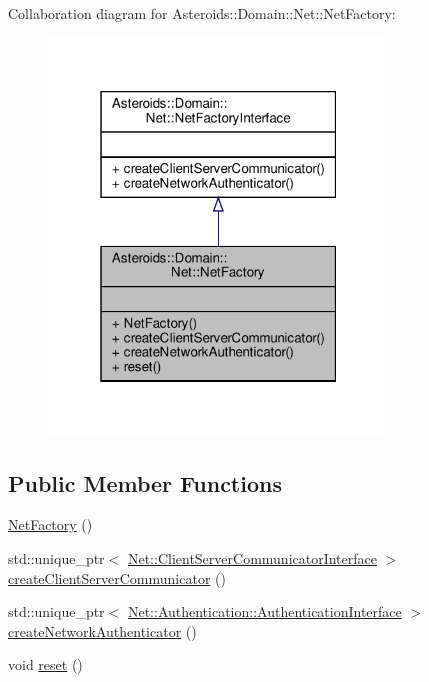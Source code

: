 Collaboration diagram for Asteroids\+:\+:Domain\+:\+:Net\+:\+:Net\+Factory\+:\nopagebreak
\begin{figure}[H]
\begin{center}
\leavevmode
\includegraphics[width=256pt]{classAsteroids_1_1Domain_1_1Net_1_1NetFactory__coll__graph}
\end{center}
\end{figure}
\subsection*{Public Member Functions}
\begin{DoxyCompactItemize}
\item 
\hyperlink{classAsteroids_1_1Domain_1_1Net_1_1NetFactory_ab5717fbd5dd1c35e1b7af78cb01269cc}{Net\+Factory} ()
\item 
std\+::unique\+\_\+ptr$<$ \hyperlink{classAsteroids_1_1Domain_1_1Net_1_1ClientServerCommunicatorInterface}{Net\+::\+Client\+Server\+Communicator\+Interface} $>$ \hyperlink{classAsteroids_1_1Domain_1_1Net_1_1NetFactory_ac7ae824eced4da33e4d79e4f219a67e1}{create\+Client\+Server\+Communicator} ()
\item 
std\+::unique\+\_\+ptr$<$ \hyperlink{classAsteroids_1_1Domain_1_1Net_1_1Authentication_1_1AuthenticationInterface}{Net\+::\+Authentication\+::\+Authentication\+Interface} $>$ \hyperlink{classAsteroids_1_1Domain_1_1Net_1_1NetFactory_a2fafb49fb45db12d21f45d2753315225}{create\+Network\+Authenticator} ()
\item 
void \hyperlink{classAsteroids_1_1Domain_1_1Net_1_1NetFactory_a7846015f917fa2d29700a8622e28fd8a}{reset} ()
\end{DoxyCompactItemize}


